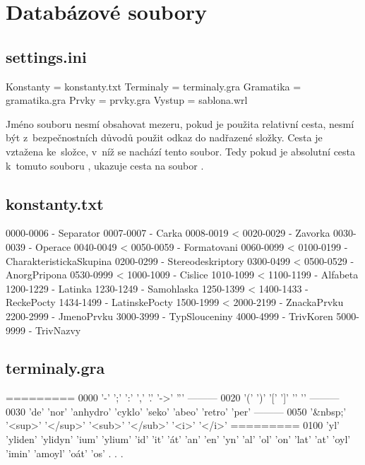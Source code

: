 \chapter{\label{priloha:databaze}Databázové soubory}
\section{settings.ini}
\begin{kodblok}
[Soubory]
Konstanty = konstanty.txt
Terminaly = terminaly.gra
Gramatika = gramatika.gra
Prvky = prvky.gra
Vystup = sablona.wrl
\end{kodblok}

Jméno souboru nesmí obsahovat mezeru, pokud je použita relativní cesta, nesmí
být z~bezpečnostních důvodů použit odkaz do nadřazené složky. Cesta je vztažena
ke~složce, v~níž se nachází tento soubor. Tedy pokud je absolutní cesta k~tomuto
souboru , ukazuje cesta
 na soubor .

\section{konstanty.txt}
\begin{kodblok}
0000-0006 - Separator 
0007-0007 - Carka 
0008-0019 <
0020-0029 - Zavorka \koment{((,),[,],\{,\})}
0030-0039 - Operace 
0040-0049 <
0050-0059 - Formatovani 
0060-0099 <
0100-0199 - CharakteristickaSkupina 
0200-0299 - Stereodeskriptory 
0300-0499 <
0500-0529 - AnorgPripona 
0530-0999 <
1000-1009 - Cislice 
1010-1099 <
1100-1199 - Alfabeta 
1200-1229 - Latinka 
1230-1249 - Samohlaska 
1250-1399 <
1400-1433 - ReckePocty 
1434-1499 - LatinskePocty 
1500-1999 <
2000-2199 - ZnackaPrvku 
2200-2999 - JmenoPrvku 
3000-3999 - TypSlouceniny 
4000-4999 - TrivKoren 
5000-9999 - TrivNazvy 
\end{kodblok}

\section{terminaly.gra}
\begin{kodblok}
========= 0000
'-'
';'
':'
','
'.'
'->'
'''
--------- 0020
'('
')'
'['
']'
'{'
'}'
--------- 0030
'de'
'nor'
'anhydro'
'cyklo'
'seko'
'abeo'
'retro'
'per'
--------- 0050
'&nbsp;'
'<sup>'
'</sup>'
'<sub>'
'</sub>'
'<i>'
'</i>'
========= 0100
'yl'
'yliden'
'ylidyn'
'ium'
'ylium'
'id'
'it'
'át'
'an'
'en'
'yn'
'al'
'ol'
'on'
'lat'
'at'
'oyl'
'imin'
'amoyl'
'oát'
'os'
  .
  .
  .
\end{kodblok}

